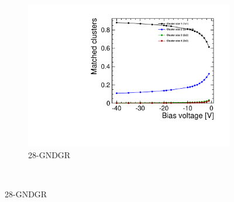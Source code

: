 \begin{figure}[htbp]
\begin{subfigure}[b]{0.33\textwidth}
    \includegraphics[width=\textwidth]{./figures/TestBeam/cluSize_bias_W0019_L08.pdf}
    \caption{28-GNDGR}
  \end{subfigure} \\


\end{figure}
